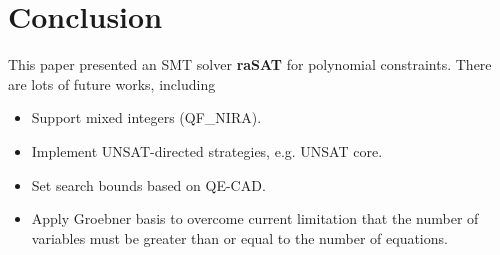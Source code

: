 \documentclass[runningheads,a4paper,oribibl]{llncs}
\newcommand{\suppress}[1]{} %
\begin{document}
\suppress{
\begin{algorithm}
\begin{algorithmic}[1]
\Function{equationsProver}{$\bigwedge\limits_{j=k}^mg_j = 0, \Pi, V_0$}
\If {$k > m$} \Comment{All equations are checked}
	\State \Return SAT
\EndIf
\For {$V_k \in P(var(g_k))$} \Comment{$P(var(g_k))$ is the powerset of $var(g_k)$}
	\If {$V_k \cap V = \emptyset$ and $ivt(g_k, V_k, \Pi)$}
		\State $V_0 \gets V_0 \cup V_k$
		\If {\Call{equationsProver}{$\bigwedge\limits_{j=k+1}^mg_j = 0, \Pi, V_0$} = SAT}
			\State \Return SAT
		\EndIf
	\EndIf
\EndFor
\State \Return UNSAT
\EndFunction
\State \Call{equationsProver}{$\bigwedge\limits_{j=1}^mg_j = 0, \Pi, \emptyset$}
\end{algorithmic}
\caption{Solving multiple equations $\bigwedge\limits_{j=1}^m g_j = 0$ with ${\Pi = \bigwedge\limits_{i = 1}^n x_i \in (l_i, h_i)}$}
\label{Al:multiple-equations}
\end{algorithm}
}%




\section{Conclusion} \label{sec:conclusion and Future Work}

This paper presented an SMT solver {\bf raSAT} for polynomial constraints.
There are lots of future works, including
\begin{itemize}
\item Support mixed integers (QF\_NIRA). 
\item Implement UNSAT-directed strategies, e.g. UNSAT core.
\item Set search bounds based on QE-CAD.
\item Apply Groebner basis to overcome current limitation that the number of variables must be greater than or equal to the number of equations. 
\end{itemize}
\end{document}
